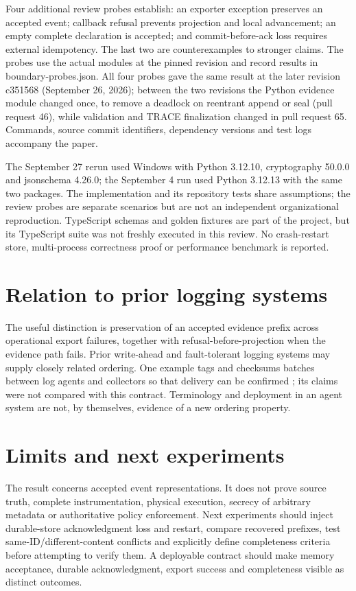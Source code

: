 \documentclass[10pt,letterpaper]{article}
\begin{document}
Four additional review probes establish: an exporter exception preserves an accepted event; callback refusal prevents projection and local advancement; an empty complete declaration is accepted; and commit-before-ack loss requires external idempotency. The last two are counterexamples to stronger claims. The probes use the actual modules at the pinned revision and record results in boundary-probes.json. All four probes gave the same result at the later revision c351568 (September 26, 2026); between the two revisions the Python evidence module changed once, to remove a deadlock on reentrant append or seal (pull request 46), while validation and TRACE finalization changed in pull request 65. Commands, source commit identifiers, dependency versions and test logs accompany the paper.


The September 27 rerun used Windows with Python 3.12.10, cryptography 50.0.0 and jsonschema 4.26.0; the September 4 run used Python 3.12.13 with the same two packages. The implementation and its repository tests share assumptions; the review probes are separate scenarios but are not an independent organizational reproduction. TypeScript schemas and golden fixtures are part of the project, but its TypeScript suite was not freshly executed in this review. No crash-restart store, multi-process correctness proof or performance benchmark is reported.


\section{Relation to prior logging systems}

The useful distinction is preservation of an accepted evidence prefix across operational export failures, together with refusal-before-projection when the evidence path fails. Prior write-ahead and fault-tolerant logging systems may supply closely related ordering. One example tags and checksums batches between log agents and collectors so that delivery can be confirmed \cite{ref6}; its claims were not compared with this contract. Terminology and deployment in an agent system are not, by themselves, evidence of a new ordering property.


\section{Limits and next experiments}

The result concerns accepted event representations. It does not prove source truth, complete instrumentation, physical execution, secrecy of arbitrary metadata or authoritative policy enforcement. Next experiments should inject durable-store acknowledgment loss and restart, compare recovered prefixes, test same-ID/different-content conflicts and explicitly define completeness criteria before attempting to verify them. A deployable contract should make memory acceptance, durable acknowledgment, export success and completeness visible as distinct outcomes.





\end{document}
